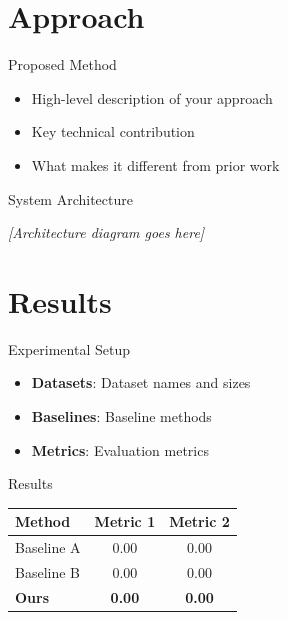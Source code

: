\documentclass[aspectratio=169]{beamer}
\begin{document}
\section{Approach}

\begin{frame}{Proposed Method}
    \begin{itemize}
        \item {{High-level description of your approach}}
        \item {{Key technical contribution}}
        \item {{What makes it different from prior work}}
    \end{itemize}

\end{frame}

\begin{frame}{System Architecture}
    \begin{center}
        \textit{[Architecture diagram goes here]}
    \end{center}
\end{frame}

\section{Results}

\begin{frame}{Experimental Setup}
    \begin{itemize}
        \item \textbf{Datasets}: {{Dataset names and sizes}}
        \item \textbf{Baselines}: {{Baseline methods}}
        \item \textbf{Metrics}: {{Evaluation metrics}}
    \end{itemize}
\end{frame}

\begin{frame}{Results}
    \begin{table}
        \centering
        \begin{tabular}{lcc}
            \toprule
            Method & Metric 1 & Metric 2 \\
            \midrule
            Baseline A & 0.00 & 0.00 \\
            Baseline B & 0.00 & 0.00 \\
            \textbf{Ours} & \textbf{0.00} & \textbf{0.00} \\
            \bottomrule
        \end{tabular}
    \end{table}
\end{frame}
\end{document}
